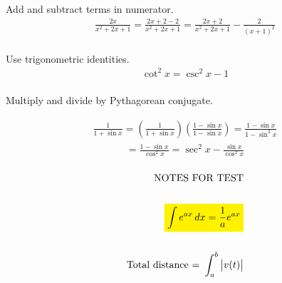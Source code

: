 \documentclass{report}
\begin{document}
Add and subtract terms in numerator.
\begin{align*}
	\frac{2 x}{x^2+2 x+1}=\frac{2 x+2-2}{x^2+2 x+1}=\frac{2 x+2}{x^2+2 x+1}-\frac{2}{(x+1)^2} \\
\end{align*}

Use trigonometric identities.
\begin{align*}
	\cot ^2 x=\csc ^2 x-1 \\
\end{align*}

Multiply and divide by Pythagorean conjugate.





\begin{align*}
	\frac{1}{1+\sin x}=\left(\frac{1}{1+\sin x}\right)\left(\frac{1-\sin x}{1-\sin x}\right)=\frac{1-\sin x}{1-\sin ^2 x}
\end{align*}
\begin{align*}
	=\frac{1-\sin x}{\cos ^2 x}=\sec ^2 x-\frac{\sin x}{\cos ^2 x} \\
\end{align*}

\qs{}{
	\text{}
}
\qs{}{}
\qs{}{}
\qs{}{}
\begin{align*}
	\text{NOTES FOR TEST} \\\\
	\colorbox{yellow}{$\displaystyle \int e^{ax} \, dx = \frac{1}{a}e^{ax}$} \\\\
	\text{Total distance = } \int_a^b \big| v(t) \big|
\end{align*}
\end{document}
